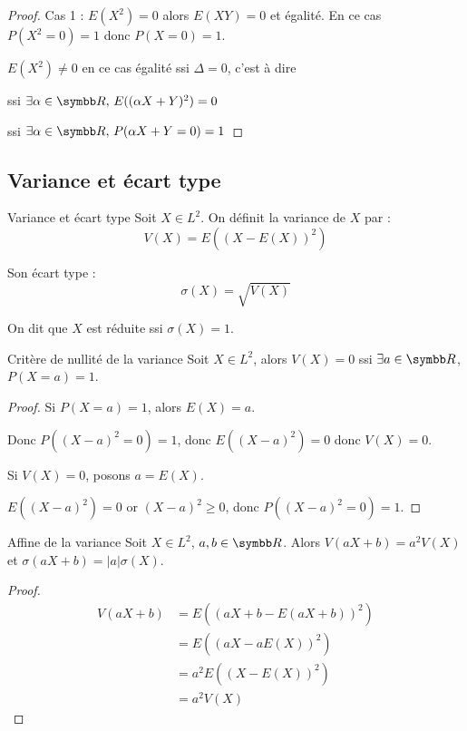 \begin{proof}
    Cas 1 : $E(X^2) = 0$ alors $E(XY) =0$ et égalité. En ce cas $P(X^2 = 0) = 1$ donc 
    $P(X = 0) = 1$.

     $E(X^2) \neq 0$ en ce cas égalité ssi $\Delta = 0$, c'est à dire
    
    ssi $\exists \alpha \in \R, \, E((\alpha X + Y)^2) = 0$

    ssi $\exists \alpha \in \R, \, P(\alpha X + Y = 0) = 1$
\end{proof}

\subsection{Variance et écart type }

\begin{definition}{Variance et écart type}{}
    Soit $X \in L^2$. On définit la variance de $X$ par : 
    $$V(X) = E\left( (X - E(X))^2 \right) $$

    Son écart type : 
    $$ \sigma(X) = \sqrt{V(X)} $$

    On dit que $X$ est réduite ssi $\sigma(X) = 1$. 
\end{definition}

\begin{proposition}{Critère de nullité de la variance}{}
    Soit $X \in L^2$, alors $V(X) = 0$ ssi 
    $\exists a \in \R$, $P(X = a) = 1$.
\end{proposition}

\begin{proof}
    Si $P(X = a) = 1$, alors $E(X) = a$.

    Donc $P((X - a)^2 = 0) = 1$, donc $E((X - a)^2) = 0$ donc $V(X) = 0$.

     Si $V(X) = 0$, posons $a = E(X)$.

    $E((X - a)^2) = 0$ or $(X - a)^2 \geqslant 0$, donc $P((X - a)^2 = 0) = 1$.
\end{proof}

\begin{proposition}{Affine de la variance}{}
    Soit $X \in L^2$, $a, b \in \R$. Alors $V(a X + b) = a^2 V(X)$ et 
    $\sigma(a X + b) = |a| \sigma(X)$.
\end{proposition}

\begin{proof}
    \begin{align}
        V(a X + b) & = E\left( (a X + b - E(a X + b))^2 \right) \\
        & = E\left( (a X - a E(X))^2 \right) \\
        & = a^2 E\left( (X - E(X))^2 \right) \\
        & = a^2 V(X)        
    \end{align}
\end{proof}

